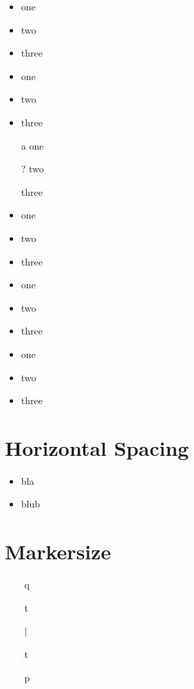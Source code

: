 \documentclass{article}
\makeatletter
\newcommand{\pp}{}%
\DeclareRobustCommand{\pp}{\mathbin{\mathpalette\pp@\relax}}
\newcommand\pp@[2]{%
	\mspace{0.5mu}%
	\vcenter{\hbox{\sbox\z@{$#1.$}\rule{2\ht\z@}{2\ht\z@}}}%
	\mspace{0.5mu}%
}
\newcommand{\blub}{}%
\DeclareRobustCommand{\blub}{\mathbin{\mathpalette\blub@\relax}}
\newcommand\blub@[2]{%
	\mspace{0.5mu}%
	\vcenter{\hbox{\sbox\z@{$#1.$}\rule{4\ht\z@}{4\ht\z@}}}%
	\mspace{0.5mu}%
}
\makeatother
\begin{document}
\begin{itemize}
	\item one
	\item two
	\item three
\end{itemize}
\begin{itemize}[label=\textcolor{blue}{$\blacktriangle$}]
	\item one
	\item two
	\item three
\end{itemize}
\begin{itemize}
	\item[a] one
	\item[?] two
	\item[] three
\end{itemize}
\begin{itemize}
	\huge
	\item one
	\LARGE
	\item two
	\tiny
	\item three
\end{itemize}
\begin{itemize}[label=\raisebox{0.25ex}{\tiny$\bullet$}]
	\item one
	\item two
	\item three
\end{itemize}
\begin{itemize}
	\fontsize{30}{1cm}\selectfont
	\item one
	\item two
	\item three
\end{itemize}
\section*{Horizontal Spacing}
\begin{itemize}[labelsep=5.5]
	\item bla
	\item blub
\end{itemize}
\section*{Markersize}

\begin{itemize}
	\item[$\pp$] q
	\item[$\pp$] t
\end{itemize}

\begin{itemize}
	\item[$\blub$] $|$
	\item[$\blub$] t
	\item[$\blub$] p
\end{itemize}
\end{document}
